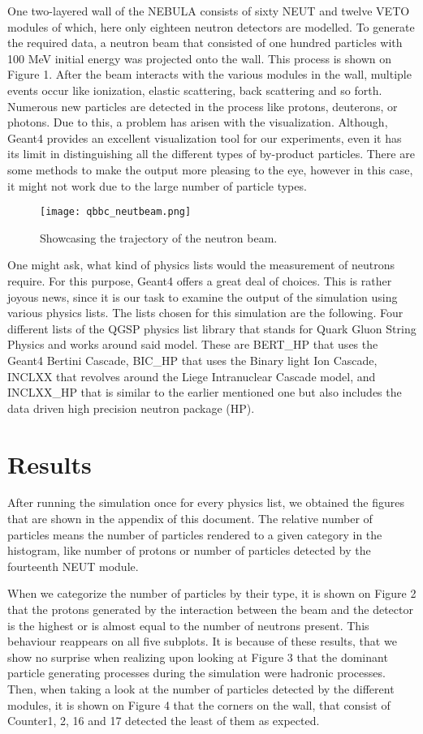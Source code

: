 \documentclass[12pt,twocolumn]{article}
\begin{document}
One two-layered wall of the NEBULA consists of sixty NEUT and twelve VETO modules of which, here only eighteen neutron detectors are modelled. \cite{nebula} To generate the required data, a neutron beam that consisted of one hundred particles with 100 MeV initial energy was projected onto the wall. This process is shown on Figure 1. After the beam interacts with the various modules in the wall, multiple events occur like ionization, elastic scattering, back scattering and so forth. Numerous new particles are detected in the process like protons, deuterons, or photons. Due to this, a problem has arisen with the visualization. Although, Geant4 provides an excellent visualization tool for our experiments, even it has its limit in distinguishing all the different types of by-product particles. There are some methods to make the output more pleasing to the eye, however in this case, it might not work due to the large number of particle types.
\begin{figure}[H]
    \centering
    \texttt{[image: qbbc\_neutbeam.png]}
    \caption{Showcasing the trajectory of the neutron beam.}
    \label{fig:my_label}
\end{figure}
One might ask, what kind of physics lists would the measurement of neutrons require. For this purpose, Geant4 offers a great deal of choices. \cite{geant} This is rather joyous news, since it is our task to examine the output of the simulation using various physics lists. The lists chosen for this simulation are the following. Four different lists of the QGSP physics list library that stands for Quark Gluon String Physics and works around said model. These are BERT\_HP that uses the Geant4 Bertini Cascade, BIC\_HP that uses the Binary light Ion Cascade, INCLXX that revolves around the Liege Intranuclear Cascade model, and INCLXX\_HP that is similar to the earlier mentioned one but also includes the data driven high precision neutron package (HP). \cite{geant}

\section{Results}
After running the simulation once for every physics list, we obtained the figures that are shown in the appendix of this document. The relative number of particles means the number of particles rendered to a given category in the histogram, like number of protons or number of particles detected by the fourteenth NEUT module.

When we categorize the number of particles by their type, it is shown on Figure 2 that the protons generated by the interaction between the beam and the detector is the highest or is almost equal to the number of neutrons present. This behaviour reappears on all five subplots. It is because of these results, that we show no surprise when realizing upon looking at Figure 3 that the dominant particle generating processes during the simulation were hadronic processes. Then, when taking a look at the number of particles detected by the different modules, it is shown on Figure 4 that the corners on the wall, that consist of Counter1, 2, 16 and 17 detected the least of them as expected.
\end{document}
